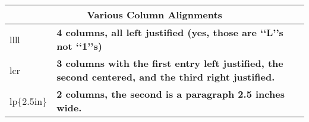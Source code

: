 \documentclass[20pt]{article}
\begin{document}
\begin{tabular}{|l|p{2.5in}|}
\multicolumn{2}{c}{Various Column Alignments}\\
\hline
llll & \textbf {4 columns, all left justified
(yes, those are ‘‘L’’s not ‘‘1’’s)}\\
lcr & \textbf{3 columns with the first entry
left justified, the second centered,
and the third right justified.}\\
lp\{2.5in\} & \textbf{2 columns, the second is
a paragraph 2.5 inches wide.}\\
\hline
\end{tabular}
\end{document}
